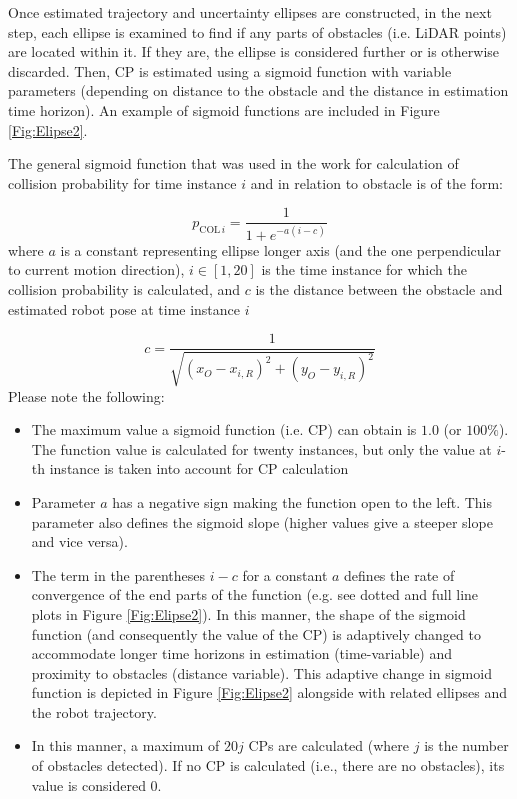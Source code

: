 Once estimated trajectory and uncertainty ellipses are constructed, in the next step, each ellipse is examined to find if any parts of obstacles (i.e. LiDAR points) are located within it. If they are, the ellipse is considered further or is otherwise discarded. Then, CP is estimated using a sigmoid function with variable parameters (depending on distance to the obstacle and the distance in estimation time horizon). An example of sigmoid functions are included in Figure \ref{Fig:Elipse2}. 

The general sigmoid function that was used in the work for calculation of collision probability for time instance $i$ and in relation to obstacle is of the form:

\begin{equation}
    p_{\textrm{COL}\,i} = \frac{1}{1+e^{-a(i-c)}}
    \label{eq:CollisionProbability}
\end{equation}
where $a$ is a constant representing ellipse longer axis (and the one perpendicular to current motion direction), $i\in[1,20]$ is the time instance for which the collision probability is calculated, and $c$ is the distance between the obstacle and estimated robot pose at time instance $i$

\[
    c=\frac{1}{\sqrt{(x_O-x_{i,R})^2+(y_O-y_{i,R})^2}}
\]
Please note the following:

\begin{itemize}
    \item The maximum value a sigmoid function (i.e. CP) can obtain is $1.0$ (or $100\%$). The function value is calculated for twenty instances, but only the value at $i$-th instance is taken into account for CP calculation
    \item Parameter $a$ has a negative sign making the function open to the left. This parameter also defines the sigmoid slope (higher values give a steeper slope and vice versa).
    \item The term in the parentheses $i-c$ for a constant $a$ defines the rate of convergence of the end parts of the function (e.g. see dotted and full line plots in Figure \ref{Fig:Elipse2}). In this manner, the shape of the sigmoid function (and consequently the value of the CP) is adaptively changed to accommodate longer time horizons in estimation (time-variable) and proximity to obstacles (distance variable). This adaptive change in sigmoid function is depicted in Figure \ref{Fig:Elipse2} alongside with related ellipses and the robot trajectory.
    \item In this manner, a maximum of $20j$ CPs are calculated (where $j$ is the number of obstacles detected). If no CP is calculated (i.e., there are no obstacles), its value is considered 0.
\end{itemize}

